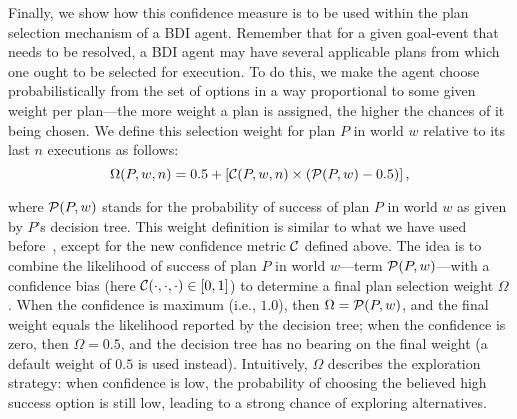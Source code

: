 \newcommand{\cSatisfies}{\psi}



Finally, we show how this confidence measure is to be used within the plan selection mechanism of a BDI agent. Remember that for a given goal-event that needs to be resolved, a BDI agent may have several applicable plans from which one ought to be selected for execution. To do this, we make the agent  choose probabilistically from the set of options in a way proportional to some given weight per plan---the more weight a plan is assigned, the higher the chances of it being chosen. 
We define this selection weight for plan $P$ in world $w$ relative to its last $n$ executions as follows: 
\[
	\Omega(P,w,n) = 0.5 + \left[  \C(P,w,n) \times  \left( \P(P,w) - 0.5 \right)  \right],
\label{eqn:omega}   
\]

\noindent 
where $\P(P,w)$ stands for the probability of success of plan $P$ in world $w$ as given by $P$'s decision tree. 
%
This weight definition is similar to what we have used before~\cite{singh10:extending,singh10:learning}, except for the new confidence metric $\C$ defined above. The idea is to combine the likelihood of success of plan $P$ in world $w$---term $\P(P,w)$---with a confidence bias (here $\C(\cdot,\cdot,\cdot) \in [0,1]$) to determine a final plan selection weight $\Omega$. 
When the confidence is maximum (i.e., $1.0$), then $\Omega = \P(P,w)$, and the final weight equals the likelihood reported by the decision tree; when the confidence is zero, then $\Omega=0.5$, and the decision tree has no bearing on the final weight (a default weight of $0.5$ is used instead).
%
Intuitively, $\Omega$ describes the exploration strategy: when confidence is low, the probability of choosing the believed high success option is still low, leading to a strong chance of exploring alternatives.
